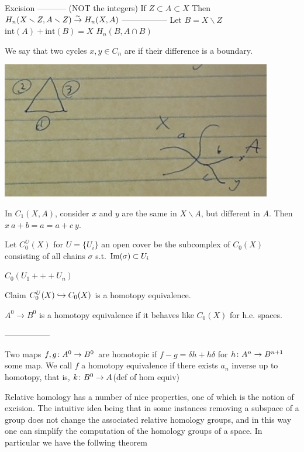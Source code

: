 \documentclass[11pt,leqno,oneside]{amsart}
\newenvironment{dateenv}{
  \vspace{1em}
}{
  \vspace{1em}
}
\newcommand{\mydate}[4]{
  \newdate{#1}{#2}{#3}{#4}
  \begin{dateenv}
    \hfill\displaydate{#1}
  \end{dateenv}
}
\numberwithin{thm}{section}
\newcommand{\minus}{\smallsetminus}
\newcommand{\homl}[1][n]{H_{#1}}
\begin{document}
Excision
-----------
(NOT the integers)
If $Z \subset A \subset X$
Then $\homl(X \minus Z, A \minus Z) \isomto \homl(X, A)$
-----------------
Let $B = X \minus Z$
$\text{int}(A) + \text{int}(B) = X$
$\homl(B, A \cap B)$

\begin{defn}
  We say that two cycles $x, y \in C_n$ are  if their difference is a boundary.
\end{defn}
\begin{example}
  \includegraphics[scale=0.4]{images/homologous}

  In $C_1(X,A)$, consider $x$ and $y$ are the same in $X \minus A$, but different in $A$.  Then $x ~ a+b = a  = a+c ~ y$.
\end{example}

Let $C^U_0(X)$ for $U = \{U_i\}$ an open cover be the subcomplex of $C_0(X)$ consisting of all chains $\sigma$ s.t. $\operatorname{Im}(\sigma) \subset U_i$

$C_0(U_1 +++ U_n)$

Claim $C^U_0(X) \hookrightarrow C_0(X)$ is a homotopy equivalence.

$A^0 \to B^0$ is a homotopy equivalence if it behaves like $C_0(X)$ for h.e. spaces.

-----------------

Two maps $f,g \colon A^0 \to B^0$ are homotopic if $f - g = \delta h + h \delta$ for $h \colon A^n \to B^{n+1}$ some map.  We call $f$ a homotopy equivalence if there exists $a_n$ inverse up to homotopy, that is, $k \colon B^0 \to A$(def of hom equiv)




\mydate{d21}{22}{3}{2017}

Relative homology has a number of nice properties, one of which is the notion of excision. The intuitive idea being that in some instances removing a subspace of a group does not change the associated relative homology groups, and in this way one can simplify the computation of the homology groups of a space. In particular we have the follwing theorem
\end{document}

